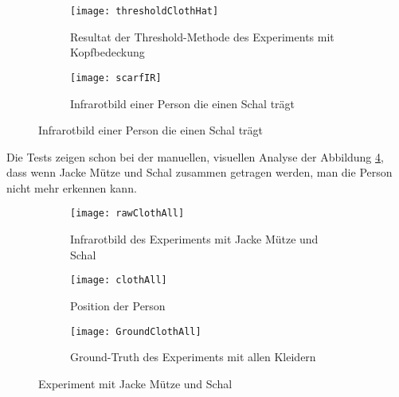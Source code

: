 \begin{figure}[H]
	\begin{subfigure}{.45\linewidth}
		\centering
		\texttt{[image: thresholdClothHat]}
		\caption{Resultat der Threshold-Methode des Experiments mit Kopfbedeckung}
		\label{fig:thresholdClothHat}
	\end{subfigure}
	\begin{subfigure}{.45\linewidth}
		\centering
		\texttt{[image: scarfIR]}
		\caption{Infrarotbild einer Person die einen Schal trägt}
		\label{fig:scarfIR}
	\end{subfigure}
	
\end{figure}


Die Tests zeigen schon bei der manuellen, visuellen Analyse der Abbildung \ref{fig:rawClothAll}, dass wenn Jacke Mütze und Schal zusammen getragen werden, man die Person nicht mehr erkennen kann.

\begin{figure}[H]
	\begin{subfigure}{.45\linewidth}
		\centering
		\texttt{[image: rawClothAll]}
		\caption{Infrarotbild des Experiments mit Jacke Mütze und Schal}
		\label{fig:rawClothAll}
	\end{subfigure}
	\begin{subfigure}{.45\linewidth}
		\centering
		\texttt{[image: clothAll]}
		\caption{Position der Person}
		\label{fig:AlgorithmsClothAll}
	\end{subfigure}
	\begin{subfigure}{\linewidth}
		\centering
		\texttt{[image: GroundClothAll]}
		\caption{Ground-Truth des Experiments mit allen Kleidern}
		\label{fig:groundTruthClothAll}
	\end{subfigure}
	\caption{Experiment mit Jacke Mütze und Schal}
	\label{fig:AllCloth}
\end{figure}

